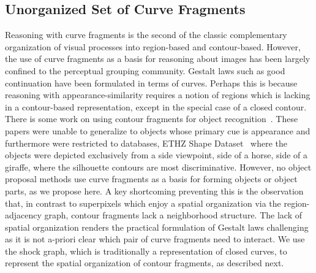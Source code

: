 \subsection{Unorganized Set of Curve Fragments}

Reasoning with curve fragments is the second of the classic complementary organization of visual processes into region-based and contour-based. However, the use of curve fragments as a basis for reasoning about images has been largely confined to the perceptual grouping community. Gestalt laws such as good continuation have been formulated in terms of curves. Perhaps this is because reasoning with appearance-similarity requires a notion of regions which is lacking in a contour-based representation, except in the special case of a closed contour. There is some work on using contour fragments for object recognition~\cite{Shotton:Blake:Cipolla:iccv05,Ferrari:Fevrier:Jurie:Schmid:PAMI08, Kumar:Torr:Zisserman:BMVC04}. These papers were unable to generalize to objects whose primary cue is appearance and furthermore were restricted to databases, ETHZ Shape Dataset~\cite{Ferrari:etal:IJCV10} where the objects were depicted exclusively from a side viewpoint, \ie side of a horse, side of a giraffe, where the silhouette contours are most discriminative. However, no object proposal methods use curve fragments as a basis for forming objects or object parts, as we propose here. A key shortcoming preventing this is the observation that, in contrast to superpixels which enjoy a spatial organization via the region-adjacency graph, contour fragments lack a neighborhood structure. The lack of spatial organization renders the practical formulation of Gestalt laws challenging as it is not a-priori clear which pair of curve fragments need to interact. We use the shock graph, which is traditionally a representation of closed curves, to represent the spatial organization of contour fragments, as described next. 


